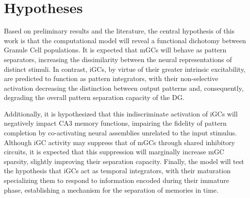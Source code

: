 \chapter{Hypotheses}

Based on preliminary results and the literature, the central hypothesis of this work is that the computational model will reveal
a functional dichotomy between Granule Cell populations. It is expected that mGCs will behave as pattern separators, increasing
the dissimilarity between the neural representations of distinct stimuli. In contrast, iGCs, by virtue of their greater
intrinsic excitability, are predicted to function as pattern integrators, with their non-selective activation decreasing the
distinction between output patterns and, consequently, degrading the overall pattern separation capacity of the DG.

Additionally, it is hypothesized that this indiscriminate activation of iGCs will negatively impact CA3 memory functions,
impairing the fidelity of pattern completion by co-activating neural assemblies unrelated to the input stimulus. Although iGC
activity may suppress that of mGCs through shared inhibitory circuits, it is expected that this suppression will marginally
increase mGC sparsity, slightly improving their separation capacity. Finally, the model will test the hypothesis that iGCs act
as temporal integrators, with their maturation specializing them to respond to information encoded during their immature phase,
establishing a mechanism for the separation of memories in time.
